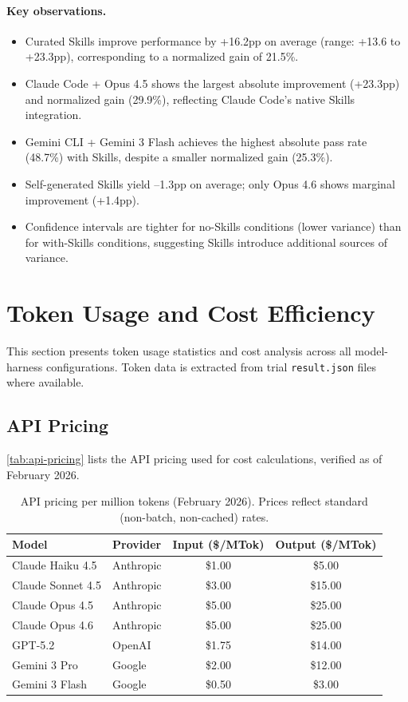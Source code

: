 \paragraph{Key observations.}
\begin{itemize}[nosep]
\item Curated Skills improve performance by +16.2pp on average (range: +13.6 to +23.3pp), corresponding to a normalized gain of 21.5\%.
\item Claude Code + Opus 4.5 shows the largest absolute improvement (+23.3pp) and normalized gain (29.9\%), reflecting Claude Code's native Skills integration.
\item Gemini CLI + Gemini 3 Flash achieves the highest absolute pass rate (48.7\%) with Skills, despite a smaller normalized gain (25.3\%).
\item Self-generated Skills yield --1.3pp on average; only Opus 4.6 shows marginal improvement (+1.4pp).
\item Confidence intervals are tighter for no-Skills conditions (lower variance) than for with-Skills conditions, suggesting Skills introduce additional sources of variance.
\end{itemize}


\section{Token Usage and Cost Efficiency}
\label{app:token-cost}

This section presents token usage statistics and cost analysis across all model-harness configurations. Token data is extracted from trial \texttt{result.json} files where available.

\subsection{API Pricing}

\autoref{tab:api-pricing} lists the API pricing used for cost calculations, verified as of February 2026.

\begin{table}[htb]
\centering
\small
\caption{API pricing per million tokens (February 2026). Prices reflect standard (non-batch, non-cached) rates.}
\label{tab:api-pricing}
\begin{tabular}{llcc}
\toprule
\textbf{Model} & \textbf{Provider} & \textbf{Input (\$/MTok)} & \textbf{Output (\$/MTok)} \\
\midrule
Claude Haiku 4.5 & Anthropic & \$1.00 & \$5.00 \\
Claude Sonnet 4.5 & Anthropic & \$3.00 & \$15.00 \\
Claude Opus 4.5 & Anthropic & \$5.00 & \$25.00 \\
Claude Opus 4.6 & Anthropic & \$5.00 & \$25.00 \\
GPT-5.2 & OpenAI & \$1.75 & \$14.00 \\
Gemini 3 Pro & Google & \$2.00 & \$12.00 \\
Gemini 3 Flash & Google & \$0.50 & \$3.00 \\
\bottomrule
\end{tabular}
\end{table}

